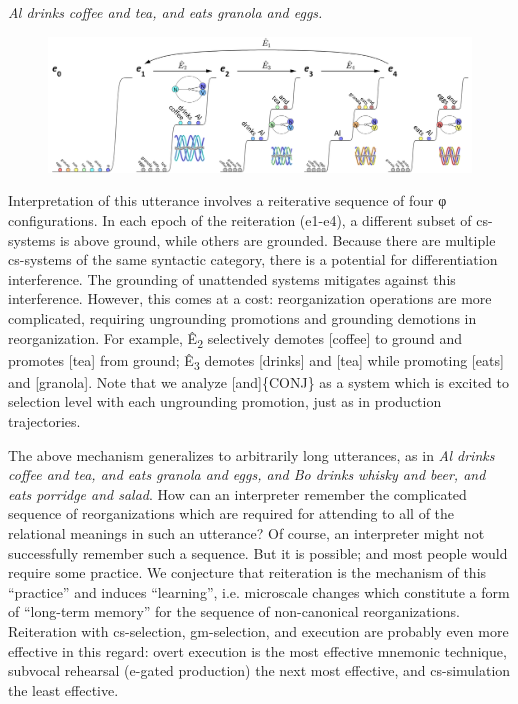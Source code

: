 \textit{Al drinks coffee and tea, and eats granola and eggs.}

  
\begin{figure}
\includegraphics[width=\textwidth]{figures/Tilsen-img123.png}
\caption{\missingcaption}
\label{fig:}
\end{figure}
 

  Interpretation of this utterance involves a reiterative sequence of four φ configurations. In each epoch of the reiteration (e1-e4), a different subset of cs-systems is above ground, while others are grounded. Because there are multiple cs-systems of the same syntactic category, there is a potential for differentiation interference. The grounding of unattended systems mitigates against this interference. However, this comes at a cost: reorganization operations are more complicated, requiring ungrounding promotions and grounding demotions in reorganization. For example, Ê\textsubscript{2} selectively demotes [coffee] to ground and promotes [tea] from ground; Ê\textsubscript{3} demotes [drinks] and [tea] while promoting [eats] and [granola]. Note that we analyze [and]\{CONJ\} as a system which is excited to selection level with each ungrounding promotion, just as in production trajectories.

  The above mechanism generalizes to arbitrarily long utterances, as in \textit{Al drinks coffee and tea, and eats granola and eggs, and Bo drinks whisky and beer, and eats porridge and salad}. How can an interpreter remember the complicated sequence of reorganizations which are required for attending to all of the relational meanings in such an utterance? Of course, an interpreter might not successfully remember such a sequence. But it is possible; and most people would require some practice. We conjecture that reiteration is the mechanism of this “practice” and induces “learning”, i.e. microscale changes which constitute a form of “long-term memory” for the sequence of non-canonical reorganizations. Reiteration with cs-selection, gm-selection, and execution are probably even more effective in this regard: overt execution is the most effective mnemonic technique, subvocal rehearsal (e-gated production) the next most effective, and cs-simulation the least effective.

